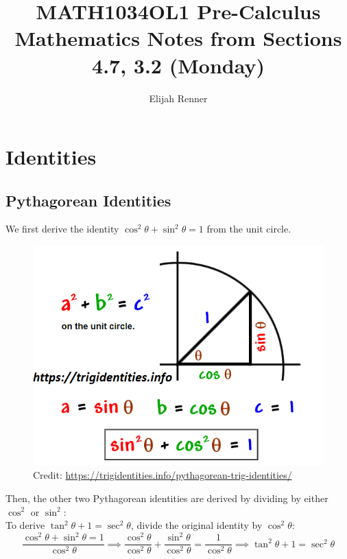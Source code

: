 \documentclass[12pt]{article}
\title{MATH1034OL1 Pre-Calculus Mathematics Notes from Sections 4.7, 3.2 (Monday)}
\author{Elijah Renner}
\begin{document}
\maketitle

\vspace{0.5in}

\tableofcontents

\section{Identities}

\subsection{Pythagorean Identities}

We first derive the identity \(\cos^2\theta + \sin^2\theta = 1\) from the unit circle.\\

\begin{figure}[H]
	\centering
	\includegraphics[scale=0.4]{Pythagorean Identity.png}
	\caption{Credit: \url{https://trigidentities.info/pythagorean-trig-identities/}}
\end{figure}

Then, the other two Pythagorean identities are derived by dividing by either \(\cos^2\) or \(\sin^2\):\\

To derive \(\tan^2\theta+1=\sec^2\theta\), divide the original identity by \(\cos^2\theta\):\\

\[\frac{\cos^2\theta + \sin^2\theta = 1}{\cos^2\theta}\implies\frac{\cos^2\theta}{\cos^2\theta}+\frac{\sin^2\theta}{\cos^2\theta}=\frac{1}{\cos^2\theta}\implies\tan^2\theta+1=\sec^2\theta\]
\end{document}
